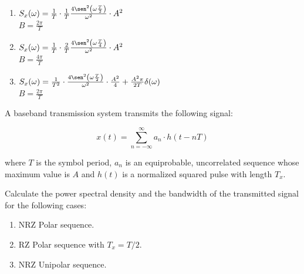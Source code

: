 \documentclass[es,boletin]{uah}
\begin{document}
{
\begin{enumerate}
	\item $S_x(\omega) = \frac{1}{T} \cdot \frac{1}{T} \frac{4 \sen^2\left ( \omega \frac{T}{2}\right )}{\omega^2} \cdot A^2$ \\
			$B = \frac{2\pi}{T}$
	\item $S_x(\omega) = \frac{1}{T} \cdot \frac{2}{T} \frac{4 \sen^2\left ( \omega \frac{T}{4}\right )}{\omega^2} \cdot A^2$ \\
			$B = \frac{4\pi}{T}$
	\item $S_x(\omega) = \frac{1}{T^2} \cdot \frac{4 \sen^2\left ( \omega \frac{T}{2}\right )}{\omega^2} \cdot \frac{A^2}{4} + \frac{A^2 \pi}{2T} \delta(\omega)$ \\
			$B = \frac{2\pi}{T}$
\end{enumerate}
}
{
	A baseband transmission system transmits the following signal:

	\begin{displaymath}
		x(t) = \sum_{n=-\infty}^{\infty} a_n \cdot h(t-nT)
	\end{displaymath}
	
	where $T$ is the symbol period, $a_n$ is an equiprobable, uncorrelated sequence whose maximum value is $A$ and $h(t)$ is a normalized squared pulse with length $T_x$. 
	
	Calculate the power spectral density and the bandwidth of the transmitted signal for the following cases:
	
	\begin{enumerate}
		\item NRZ Polar sequence.
		 \item RZ Polar sequence with $T_x=T/2$.
		 \item NRZ Unipolar sequence.
	\end{enumerate}
	
}
\end{document}
